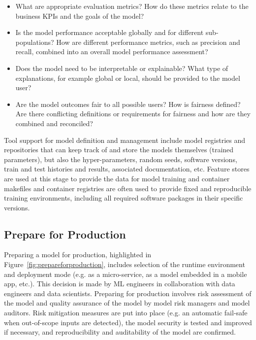 \begin{itemize}
   \item What are appropriate evaluation metrics? How do these metrics relate to the business KPIs and the goals of the model?
   \item Is the model performance acceptable globally and for different sub-populations? How are different performance metrics, such as precision and recall, combined into an overall model performance assessment?
   \item Does the model need to be interpretable or explainable? What type of explanations, for example global or local, should be provided to the model user? 
   \item Are the model outcomes fair to all possible users? How is fairness defined? Are there conflicting definitions or requirements for fairness and how are they combined and reconciled?
\end{itemize}

Tool support for model definition and management include model registries and repositories that can keep track of and store the models themselves (trained parameters), but also the hyper-parameters, random seeds, software versions, train and test histories and results, associated documentation, etc. Feature stores are used at this stage to provide the data for model training and container makefiles and container registries are often used to provide fixed and reproducible training environments, including all required software packages in their specific versions.  

\subsection{Prepare for Production}

Preparing a model for production, highlighted in Figure~\ref{fig:prepareforproduction}, includes selection of the runtime environment and deployment mode (e.g. as a micro-service, as a model embedded in a mobile app, etc.). This decision is made by ML engineers in collaboration with data engineers and data scientists. Preparing for production involves risk assessment of the model and quality assurance of the model by model risk managers and model auditors. Risk mitigation measures are put into place (e.g. an automatic fail-safe when out-of-scope inputs are detected), the model security is tested and improved if necessary, and reproducibility and auditability of the model are confirmed. 

